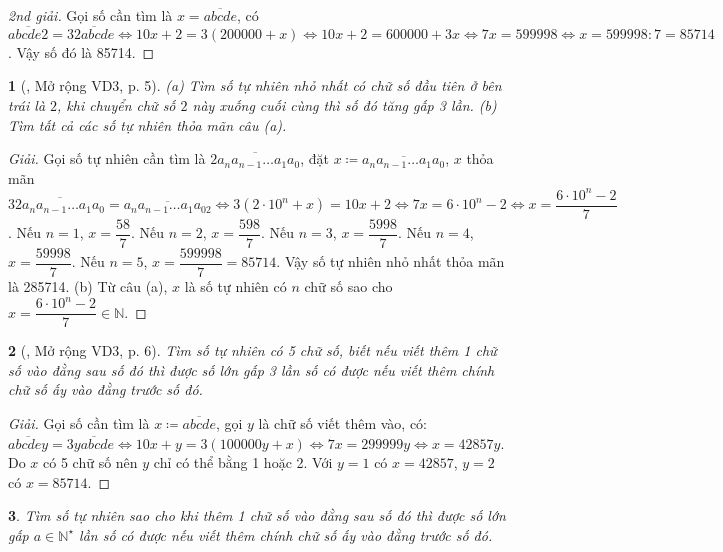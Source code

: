 \documentclass{article}
\newtheorem{baitoan}{}
\begin{document}
\begin{proof}[2nd giải]
	Gọi số cần tìm là $x = \overline{abcde}$, có $\overline{abcde2} = 3\overline{2abcde}\Leftrightarrow10x + 2 = 3(200000 + x)\Leftrightarrow10x + 2 = 600000 + 3x\Leftrightarrow7x = 599998\Leftrightarrow x = 599998:7 = 85714$. Vậy số đó là 85714.
\end{proof}

\begin{baitoan}[\cite{Binh_Toan_6_tap_1}, Mở rộng VD3, p. 5]
	(a) Tìm số tự nhiên nhỏ nhất có chữ số đầu tiên ở bên trái là $2$, khi chuyển chữ số $2$ này xuống cuối cùng thì số đó tăng gấp 3 lần. (b) Tìm tất cả các số tự nhiên thỏa mãn câu (a).
\end{baitoan}

\begin{proof}[Giải]
	Gọi số tự nhiên cần tìm là $\overline{2a_na_{n-1}\ldots a_1a_0}$, đặt $x\coloneqq\overline{a_na_{n-1}\ldots a_1a_0}$, $x$ thỏa mãn $3\overline{2a_na_{n-1}\ldots a_1a_0} = \overline{a_na_{n-1}\ldots a_1a_02}\Leftrightarrow3(2\cdot10^n + x) = 10x + 2\Leftrightarrow7x = 6\cdot10^n - 2\Leftrightarrow x = \dfrac{6\cdot10^n - 2}{7}$. Nếu $n = 1$, $x = \dfrac{58}{7}$. Nếu $n = 2$, $x = \dfrac{598}{7}$. Nếu $n = 3$, $x = \dfrac{5998}{7}$. Nếu $n = 4$, $x = \dfrac{59998}{7}$. Nếu $n = 5$, $x = \dfrac{599998}{7} = 85714$. Vậy số tự nhiên nhỏ nhất thỏa mãn là 285714. (b) Từ câu (a), $x$ là số tự nhiên có $n$ chữ số sao cho $x = \dfrac{6\cdot10^n - 2}{7}\in\mathbb{N}$.
\end{proof}

\begin{baitoan}[\cite{Binh_Toan_6_tap_1}, Mở rộng VD3, p. 6]
	Tìm số tự nhiên có 5 chữ số, biết nếu viết thêm 1 chữ số vào đằng sau số đó thì được số lớn gấp 3 lần số có được nếu viết thêm chính chữ số ấy vào đằng trước số đó.
\end{baitoan}

\begin{proof}[Giải]
	Gọi số cần tìm là $x\coloneqq\overline{abcde}$, gọi $y$ là chữ số viết thêm vào, có: $\overline{abcdey} = 3\overline{yabcde}\Leftrightarrow10x + y = 3(100000y + x)\Leftrightarrow7x = 299999y\Leftrightarrow x = 42857y$. Do $x$ có 5 chữ số nên $y$ chỉ có thể bằng 1 hoặc 2. Với $y = 1$ có $x = 42857$, $y = 2$ có $x = 85714$.
\end{proof}

\begin{baitoan}
	Tìm số tự nhiên sao cho khi thêm 1 chữ số vào đằng sau số đó thì được số lớn gấp $a\in\mathbb{N}^\star$ lần số có được nếu viết thêm chính chữ số ấy vào đằng trước số đó.
\end{baitoan}
\end{document}
